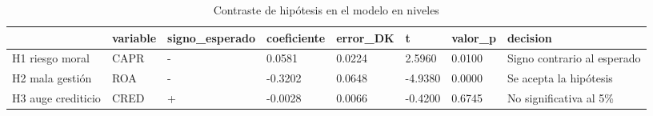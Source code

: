 \begin{table}[htbp]
\centering
\caption{Contraste de hipótesis en el modelo en niveles}
\begin{tabular}{llllllll}
\hline
 & variable & signo\_esperado & coeficiente & error\_DK & t & valor\_p & decision \\
\hline
H1 riesgo moral & CAPR & - & 0.0581 & 0.0224 & 2.5960 & 0.0100 & Signo contrario al esperado \\
H2 mala gestión & ROA & - & -0.3202 & 0.0648 & -4.9380 & 0.0000 & Se acepta la hipótesis \\
H3 auge crediticio & CRED & + & -0.0028 & 0.0066 & -0.4200 & 0.6745 & No significativa al 5\% \\
\hline
\end{tabular}
\label{tab:tabla7c_hipotesis_niveles}
\end{table}